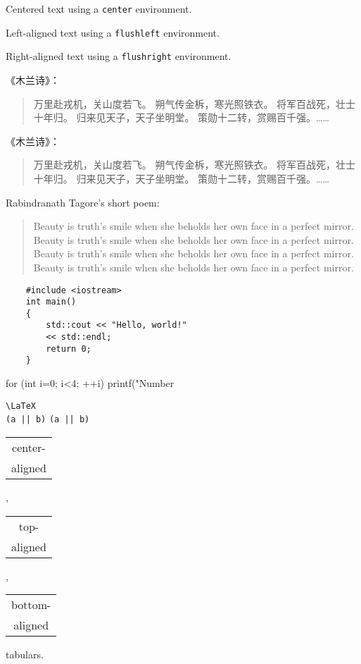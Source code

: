 \documentclass[11pt,a4paper]{report}
\begin{document}
\begin{center}
	Centered text using a
	\verb|center| environment.
\end{center}
\begin{flushleft}
	Left-aligned text using a
	\verb|flushleft| environment.
\end{flushleft}
\begin{flushright}
	Right-aligned text using a
	\verb|flushright| environment.
	\newline
\end{flushright}


《木兰诗》：
\begin{quotation}
	万里赴戎机，关山度若飞。
	朔气传金柝，寒光照铁衣。
	将军百战死，壮士十年归。
	归来见天子，天子坐明堂。
	策勋十二转，赏赐百千强。……
\end{quotation}

《木兰诗》：
\begin{quote}
	万里赴戎机，关山度若飞。
	朔气传金柝，寒光照铁衣。
	将军百战死，壮士十年归。
	归来见天子，天子坐明堂。
	策勋十二转，赏赐百千强。……
\end{quote}

Rabindranath Tagore's short poem:
\begin{verse}
	Beauty is truth's smile
	when she beholds her own face in
	a perfect mirror. 
	Beauty is truth's smile
	when she beholds her own face in
	a perfect mirror. 
	Beauty is truth's smile
	when she beholds her own face in
	a perfect mirror.
	Beauty is truth's smile
	when she beholds her own face in
	a perfect mirror.
\end{verse}

\begin{verbatim}
	#include <iostream>
	int main()
	{
		std::cout << "Hello, world!"
		<< std::endl;
		return 0;
	}
\end{verbatim}

\begin{verbatim*}
	for (int i=0; i<4; ++i)
	printf("Number %d\n",i);
\end{verbatim*}

\verb|\LaTeX| \\
\verb+(a || b)+ \verb*+(a || b)+

\begin{tabular}{|c|}
	center-\\ aligned \\
\end{tabular},
\begin{tabular}[t]{|c|}
	top-\\ aligned \\
\end{tabular},
\begin{tabular}[b]{|c|}
	bottom-\\ aligned\\
\end{tabular} tabulars.
\end{document}
